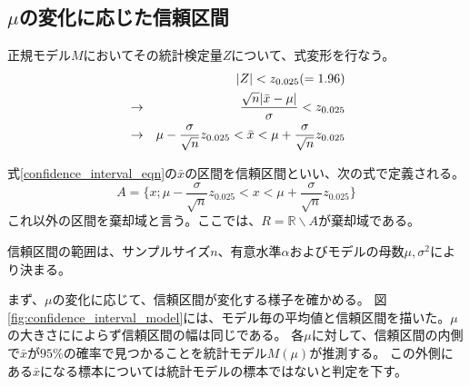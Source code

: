 


\subsection{$\mu$の変化に応じた信頼区間}
正規モデル$M$においてその統計検定量$Z$について、式変形を行なう。
\begin{eqnarray}
    & &|Z| < z_{0.025}( = 1.96 ) \notag \\
    &\rightarrow& \frac{\sqrt{n}|\bar{x}-\mu|}{\sigma} < z_{0.025} \notag\\
    &\rightarrow& \mu-\frac{\sigma}{\sqrt{n}}z_{0.025} < \bar{x} < \mu+\frac{\sigma}{\sqrt{n}}z_{0.025} \label{confidence_interval_eqn}
\end{eqnarray}

\begin{defi}
式\eqref{confidence_interval_eqn}の$\bar{x}$の区間を信頼区間といい、次の式で定義される。
\begin{equation*}
    A=\{x;\mu-\frac{\sigma}{\sqrt{n}}z_{0.025} < x < \mu+\frac{\sigma}{\sqrt{n}}z_{0.025} \}
\end{equation*}
これ以外の区間を棄却域と言う。ここでは、$R=\mathbb{R}\backslash A$が棄却域である。
\end{defi}
信頼区間の範囲は、サンプルサイズ$n$、有意水準$\alpha$およびモデルの母数$\mu,\sigma^2$により決まる。

まず、$\mu$の変化に応じて、信頼区間が変化する様子を確かめる。
図\ref{fig:confidence_interval_model}には、モデル毎の平均値と信頼区間を描いた。$\mu$の大きさにによらず信頼区間の幅は同じである。
各$\mu$に対して、信頼区間の内側で$\bar{x}$が$95\%$の確率で見つかることを統計モデル$M(\mu)$が推測する。
この外側にある$\bar{x}$になる標本については統計モデルの標本ではないと判定を下す。

